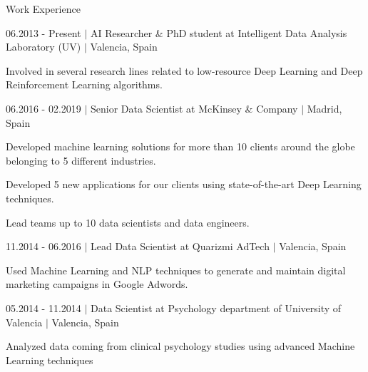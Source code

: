\documentclass{resume} %
\begin{document}
\begin{rSection}{Work Experience}
\begin{rSubsection}{06.2013 - Present $|$ AI Researcher \& PhD student at Intelligent Data Analysis Laboratory (UV) $|$ \textnormal{Valencia, Spain}\hspace{-10pt}}{}{}
	\vspace{-3pt}

	\item Involved in several research lines related to low-resource Deep Learning and Deep Reinforcement Learning algorithms.

\end{rSubsection}

\vspace{-6pt}

\begin{rSubsection}{06.2016 - 02.2019 $|$ Senior Data Scientist at McKinsey \& Company  $|$ \textnormal{Madrid, Spain}}{}{}

    \vspace{-3pt}

    \item Developed machine learning solutions for more than 10 clients around the globe belonging to 5 different industries.
    \item Developed 5 new applications for our clients using state-of-the-art Deep Learning techniques.
    \item Lead teams up to 10 data scientists and data engineers.
\end{rSubsection}

\vspace{-6pt}

\begin{rSubsection}{11.2014 - 06.2016 $|$ Lead Data Scientist at Quarizmi AdTech  $|$  \textnormal{Valencia, Spain}}{}{}

    \vspace{-3pt}

    \item Used Machine Learning and NLP techniques to generate and maintain digital marketing campaigns in Google Adwords.
\end{rSubsection}

\vspace{-6pt}

\begin{rSubsection}{05.2014 - 11.2014 $|$ Data Scientist at Psychology department of University of Valencia  $|$  \textnormal{Valencia, Spain}}{}{}

    \vspace{-3pt}

    \item Analyzed data coming from clinical psychology studies using advanced Machine Learning techniques

\end{rSubsection}


\end{rSection}
\end{document}
